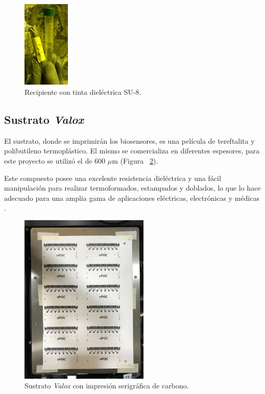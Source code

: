 \begin{figure}[H]
  \centering
    \includegraphics[width=0.2\textwidth]{Figuras/Figura_tinta_SU8}
  \caption{Recipiente con tinta dieléctrica SU-8.}
  \label{fig:Figura_tinta_SU8}
\end{figure}

\subsection{Sustrato \textit{Valox}}
El sustrato, donde se imprimirán los biosensores, es una película de tereftalita y polibutileno termoplástico. El mismo se comercializa en diferentes espesores, para este proyecto se utilizó el de 600 $\mu$m (Figura ~\ref{fig:Figura_Valox}).

Este compuesto posee una excelente resistencia dieléctrica y una fácil manipulación para realizar termoformados, estampados y doblados, lo que lo hace adecuado para una amplia gama de aplicaciones eléctricas, electrónicas y médicas \cite{Valox}.

\begin{figure}[H]
  \centering
    \includegraphics[width=0.55\textwidth]{Figuras/Figura_Valox}
  \caption{Sustrato \textit{Valox} con impresión serigráfica de carbono.}
  \label{fig:Figura_Valox}
\end{figure}

